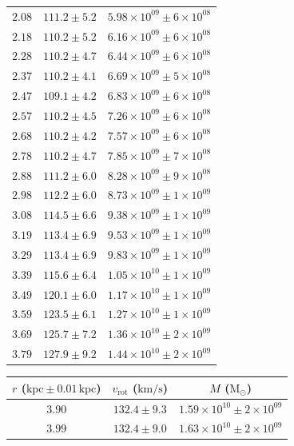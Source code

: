\documentclass{article}
\newcommand\solmass{\textrm{M}_\odot}
\newcommand\kpc{\textrm{kpc}}
\newcommand\kmps{\textrm{km}/\textrm{s}}
\newcommand\vrot{\ensuremath{v_{\textrm{rot}}}}
\begin{document}
\begin{table}[h!]
\begin{tabular}{|c|c|c|}
        $2.08$ & $111.2 \pm 5.2$ & $5.98\times 10^{09} \pm 6\times 10^{08}$ \\
        $2.18$ & $110.2 \pm 5.2$ & $6.16\times 10^{09} \pm 6\times 10^{08}$ \\
        $2.28$ & $110.2 \pm 4.7$ & $6.44\times 10^{09} \pm 6\times 10^{08}$ \\
        $2.37$ & $110.2 \pm 4.1$ & $6.69\times 10^{09} \pm 5\times 10^{08}$ \\
        $2.47$ & $109.1 \pm 4.2$ & $6.83\times 10^{09} \pm 6\times 10^{08}$ \\
        $2.57$ & $110.2 \pm 4.5$ & $7.26\times 10^{09} \pm 6\times 10^{08}$ \\
        $2.68$ & $110.2 \pm 4.2$ & $7.57\times 10^{09} \pm 6\times 10^{08}$ \\
        $2.78$ & $110.2 \pm 4.7$ & $7.85\times 10^{09} \pm 7\times 10^{08}$ \\
        $2.88$ & $111.2 \pm 6.0$ & $8.28\times 10^{09} \pm 9\times 10^{08}$ \\
        $2.98$ & $112.2 \pm 6.0$ & $8.73\times 10^{09} \pm 1\times 10^{09}$ \\
        $3.08$ & $114.5 \pm 6.6$ & $9.38\times 10^{09} \pm 1\times 10^{09}$ \\
        $3.19$ & $113.4 \pm 6.9$ & $9.53\times 10^{09} \pm 1\times 10^{09}$ \\
        $3.29$ & $113.4 \pm 6.9$ & $9.83\times 10^{09} \pm 1\times 10^{09}$ \\
        $3.39$ & $115.6 \pm 6.4$ & $1.05\times 10^{10} \pm 1\times 10^{09}$ \\
        $3.49$ & $120.1 \pm 6.0$ & $1.17\times 10^{10} \pm 1\times 10^{09}$ \\
        $3.59$ & $123.5 \pm 6.1$ & $1.27\times 10^{10} \pm 1\times 10^{09}$ \\
        $3.69$ & $125.7 \pm 7.2$ & $1.36\times 10^{10} \pm 2\times 10^{09}$ \\
        $3.79$ & $127.9 \pm 9.2$ & $1.44\times 10^{10} \pm 2\times 10^{09}$ \\
        \hline
    \end{tabular}
    \hfill
    \begin{tabular}{|c|c|c|}
        \hline
        $r$ ($\kpc \pm 0.01 \,\kpc$) & $\vrot$ ($\kmps$) & $M$ ($\solmass$) \\
        \hline
        $3.90$ & $132.4 \pm 9.3$ & $1.59\times 10^{10} \pm 2\times 10^{09}$ \\
        $3.99$ & $132.4 \pm 9.0$ & $1.63\times 10^{10} \pm 2\times 10^{09}$ \\

\end{tabular}
\end{table}
\end{document}
